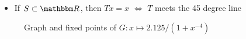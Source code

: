 \begin{frame}
    
    \Eg
    \begin{itemize}
        \item If $S \subset \RR$, then  $Tx =x$ $\iff$ $T$ meets the 45 degree line
    \end{itemize}


\end{frame}



\begin{frame}
    
    \begin{figure}
        \centering
        \caption{\label{f:three_fixed_points} 
            Graph and fixed points of $G \colon x \mapsto 2.125/(1 + x^{-4})$ }
    \end{figure}

\end{frame}


